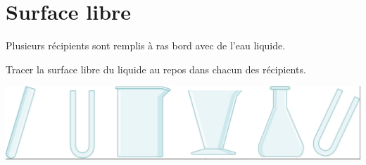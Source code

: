 \section{Surface libre}\label{ex:surface}

Plusieurs récipients sont remplis à ras bord avec de l'eau liquide.


\begin{questions}
	
			
		\question[] Tracer la surface libre du liquide au repos dans chacun des récipients.
		
		\begin{center}
			\includegraphics[scale=0.3]{img/surface}
		\end{center}	
\end{questions}
